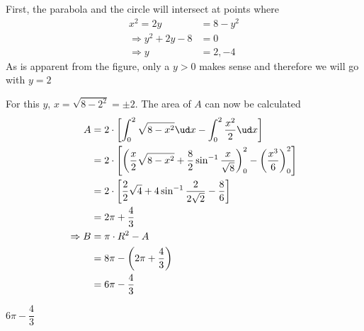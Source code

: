 \begin{solution}[\fullpage]
  First, the parabola and the circle will intersect at points where
  \begin{align}
     x^2 = 2y &= 8-y^2 \\
     \Rightarrow y^2+2y-8 &= 0 \\
     \Rightarrow y &= 2, -4
  \end{align}
  As is apparent from the figure, only a $y > 0$ makes sense and therefore
  we will go with $y = 2$
  
  For this $y$, $x = \sqrt{8-2^2} = \pm 2$. The area of $A$ can now be calculated
  \begin{align}
     A &= 2\cdot\left[ \int_0^2 \sqrt{8-x^2}\ud x - \int_0^2\dfrac{x^2}{2}\ud x\right] \\
       &= 2\cdot\left[ \left(\dfrac{x}{2}\sqrt{8-x^2}+\dfrac{8}{2}\sin^{-1}\dfrac{x}{\sqrt{8}}\right)_0^2 
       - \left( \dfrac{x^3}{6}\right)_0^2\right] \\
       &= 2\cdot\left[ \dfrac{2}{2}\sqrt{4}+4\sin^{-1}\dfrac{2}{2\sqrt{2}} - \dfrac{8}{6}\right] \\
       &= 2\pi + \frac{4}{3} \\
    \Rightarrow B &= \pi\cdot R^2 - A \\ 
                  &= 8\pi - \left( 2\pi + \frac{4}{3}\right) \\
                  &= 6\pi - \frac{4}{3}
  \end{align}
\end{solution}

\ifprintanswers\begin{codex}$6\pi-\dfrac{4}{3}$\end{codex}\fi
